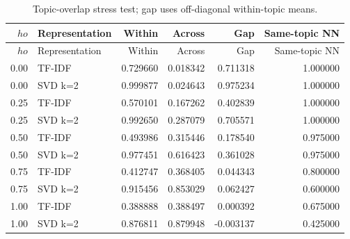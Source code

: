{\small\renewcommand{\arraystretch}{1.05}
\begin{longtable}{rlrrrr}
\caption{Topic-overlap stress test; gap uses off-diagonal within-topic means.}\\
\toprule
$
ho$ & Representation & Within & Across & Gap & Same-topic NN \\ \midrule\endfirsthead
\toprule
$
ho$ & Representation & Within & Across & Gap & Same-topic NN \\ \midrule\endhead
0.00 & TF-IDF & 0.729660 & 0.018342 & 0.711318 & 1.000000 \\
0.00 & SVD k=2 & 0.999877 & 0.024643 & 0.975234 & 1.000000 \\
0.25 & TF-IDF & 0.570101 & 0.167262 & 0.402839 & 1.000000 \\
0.25 & SVD k=2 & 0.992650 & 0.287079 & 0.705571 & 1.000000 \\
0.50 & TF-IDF & 0.493986 & 0.315446 & 0.178540 & 0.975000 \\
0.50 & SVD k=2 & 0.977451 & 0.616423 & 0.361028 & 0.975000 \\
0.75 & TF-IDF & 0.412747 & 0.368405 & 0.044343 & 0.800000 \\
0.75 & SVD k=2 & 0.915456 & 0.853029 & 0.062427 & 0.600000 \\
1.00 & TF-IDF & 0.388888 & 0.388497 & 0.000392 & 0.675000 \\
1.00 & SVD k=2 & 0.876811 & 0.879948 & -0.003137 & 0.425000 \\
\bottomrule
\end{longtable}
}

